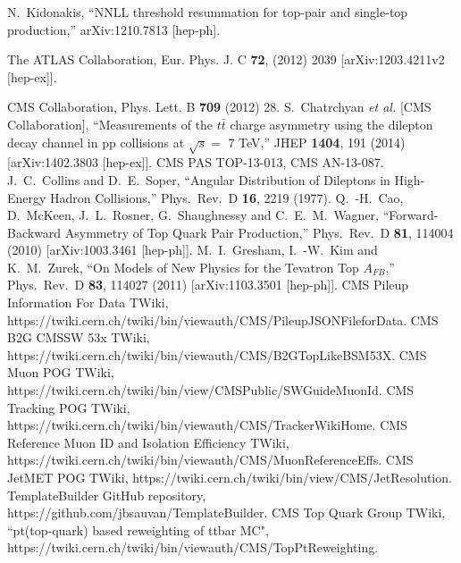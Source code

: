 \documentclass{cmspaperpdf}
\begin{document}
\begin{thebibliography}{9}
  N.~Kidonakis,
  ``NNLL threshold resummation for top-pair and single-top production,''
  arXiv:1210.7813 [hep-ph].
  
 The ATLAS Collaboration, Eur. Phys. J. C \textbf{72}, (2012) 2039 [arXiv:1203.4211v2 [hep-ex]].
   
  CMS Collaboration, Phys. Lett. B \textbf{709} (2012) 28.
  S.~Chatrchyan {\it et al.}  [CMS Collaboration],
  ``Measurements of the $t\bar{t}$ charge asymmetry using the dilepton decay channel in pp collisions at $\sqrt{s} =$ 7 TeV,''
  JHEP {\bf 1404}, 191 (2014)
  [arXiv:1402.3803 [hep-ex]].
  CMS PAS TOP-13-013, CMS AN-13-087.
  J.~C.~Collins and D.~E.~Soper,
  ``Angular Distribution of Dileptons in High-Energy Hadron Collisions,''
  Phys.\ Rev.\ D {\bf 16}, 2219 (1977).
  Q.~-H.~Cao, D.~McKeen, J.~L.~Rosner, G.~Shaughnessy and C.~E.~M.~Wagner,
  ``Forward-Backward Asymmetry of Top Quark Pair Production,''
  Phys.\ Rev.\ D {\bf 81}, 114004 (2010)
  [arXiv:1003.3461 [hep-ph]].
  M.~I.~Gresham, I.~-W.~Kim and K.~M.~Zurek,
  ``On Models of New Physics for the Tevatron Top $A_{FB}$,''
  Phys.\ Rev.\ D {\bf 83}, 114027 (2011)
  [arXiv:1103.3501 [hep-ph]].
  CMS Pileup Information For Data TWiki, https://twiki.cern.ch/twiki/bin/viewauth/CMS/PileupJSONFileforData.
  CMS B2G CMSSW 53x TWiki, https://twiki.cern.ch/twiki/bin/viewauth/CMS/B2GTopLikeBSM53X.
  CMS Muon POG TWiki, https://twiki.cern.ch/twiki/bin/view/CMSPublic/SWGuideMuonId.
  CMS Tracking POG TWiki, https://twiki.cern.ch/twiki/bin/viewauth/CMS/TrackerWikiHome.
  CMS Reference Muon ID and Isolation Efficiency TWiki, https://twiki.cern.ch/twiki/bin/viewauth/CMS/MuonReferenceEffs.
  CMS JetMET POG TWiki, https://twiki.cern.ch/twiki/bin/view/CMS/JetResolution.
  TemplateBuilder GitHub repository, https://github.com/jbsauvan/TemplateBuilder.
  CMS Top Quark Group TWiki, ``pt(top-quark) based reweighting of ttbar MC", https://twiki.cern.ch/twiki/bin/viewauth/CMS/TopPtReweighting.

\end{thebibliography}
\end{document}
